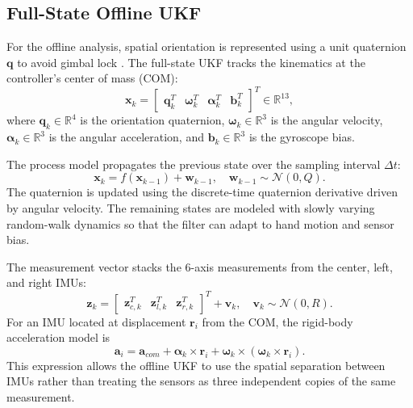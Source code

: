 \documentclass[conference]{IEEEtran}
\begin{document}
\subsection{Full-State Offline UKF}
For the offline analysis, spatial orientation is represented using a unit quaternion $\mathbf{q}$ to avoid gimbal lock \cite{kuipers1999,crassidis2003}. The full-state UKF tracks the kinematics at the controller's center of mass (COM):
\begin{equation}
\mathbf{x}_k =
\begin{bmatrix}
\mathbf{q}_k^T &
\boldsymbol{\omega}_k^T &
\boldsymbol{\alpha}_k^T &
\mathbf{b}_k^T
\end{bmatrix}^T
\in \mathbb{R}^{13},
\end{equation}
where $\mathbf{q}_k \in \mathbb{R}^4$ is the orientation quaternion, $\boldsymbol{\omega}_k \in \mathbb{R}^3$ is the angular velocity, $\boldsymbol{\alpha}_k \in \mathbb{R}^3$ is the angular acceleration, and $\mathbf{b}_k \in \mathbb{R}^3$ is the gyroscope bias.

The process model propagates the previous state over the sampling interval $\Delta t$:
\begin{equation}
\mathbf{x}_k = f(\mathbf{x}_{k-1}) + \mathbf{w}_{k-1},
\quad
\mathbf{w}_{k-1} \sim \mathcal{N}(0,Q).
\end{equation}
The quaternion is updated using the discrete-time quaternion derivative driven by angular velocity. The remaining states are modeled with slowly varying random-walk dynamics so that the filter can adapt to hand motion and sensor bias.

The measurement vector stacks the 6-axis measurements from the center, left, and right IMUs:
\begin{equation}
\mathbf{z}_k =
\begin{bmatrix}
\mathbf{z}_{c,k}^T &
\mathbf{z}_{l,k}^T &
\mathbf{z}_{r,k}^T
\end{bmatrix}^T
+ \mathbf{v}_k,
\quad
\mathbf{v}_k \sim \mathcal{N}(0,R).
\end{equation}
For an IMU located at displacement $\mathbf{r}_i$ from the COM, the rigid-body acceleration model is
\begin{equation}
\mathbf{a}_i =
\mathbf{a}_{com} +
\boldsymbol{\alpha}_k \times \mathbf{r}_i +
\boldsymbol{\omega}_k \times
\left(\boldsymbol{\omega}_k \times \mathbf{r}_i\right).
\end{equation}
This expression allows the offline UKF to use the spatial separation between IMUs rather than treating the sensors as three independent copies of the same measurement.
\end{document}
